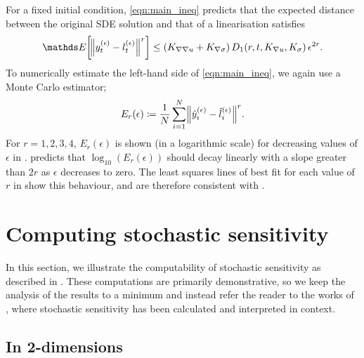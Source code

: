 For a fixed initial condition, \cref{eqn:main_ineq} predicts that the expected distance between the original SDE solution and that of a linearisation satisfies
\[
	\avg{\norm{y_t^{(\epsilon)} - l_t^{(\epsilon)}}^r} \leq \left(K_{\nabla\nabla u} + K_{\nabla\sigma}\right)D_1\!\left(r,t, K_{\nabla u}, K_\sigma\right)\epsilon^{2r}.
\]
To numerically estimate the left-hand side of \cref{eqn:main_ineq}, we again use a Monte Carlo estimator;
\[
	E_r\!\left(\epsilon\right) \coloneqq \frac{1}{N}\sum_{i=1}^N{\norm{\hat{y}_i^{(\epsilon)} - \hat{l}_i^{(\epsilon)}}^r}.
\]
For \(r = 1,2,3,4\), \(E_r\!\left(\epsilon\right)\) is shown (in a logarithmic scale) for decreasing values of \(\epsilon\) in .
 predicts that \(\log_{10}\left(E_r\!\left(\epsilon\right)\right)\) should decay linearly with a slope greater than \(2r\) as \(\epsilon\) decreases to zero.
The least squares lines of best fit for each value of \(r\) in  show this behaviour, and are therefore consistent with .



\section{Computing stochastic sensitivity} \label{sec:comput_s2}
In this section, we illustrate the computability of stochastic sensitivity as described in .
These computations are primarily demonstrative, so we keep the analysis of the results to a minimum and instead refer the reader to the works of \citet{Balasuriya_2020_StochasticSensitivityComputable,BadzaEtAl_2023_HowSensitiveAre,FangEtAl_2020_DisentanglingResolutionPrecision}, where stochastic sensitivity has been calculated and interpreted in context.

\subsection{In 2-dimensions}\label{sec:compute_s2_2d}

